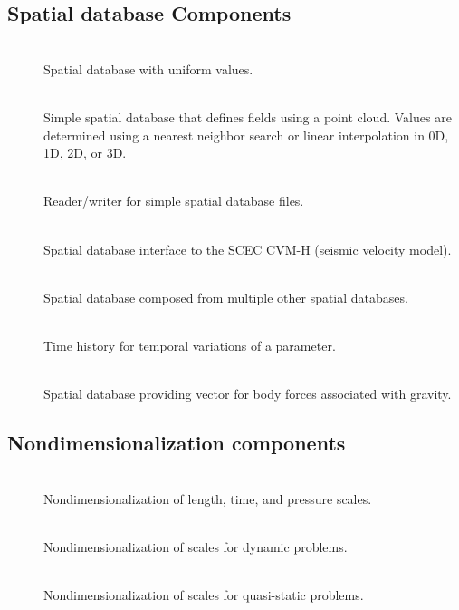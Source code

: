 \subsection{Spatial database Components}
\begin{description}
\item [] \\
Spatial database with uniform values.
\item [] \\
Simple spatial database that defines fields using a point cloud. Values
are determined using a nearest neighbor search or linear interpolation
in 0D, 1D, 2D, or 3D.
\item [] \\
Reader/writer for simple spatial database files.
\item [] \\
Spatial database interface to the SCEC CVM-H (seismic velocity model).
\item [] \\
Spatial database composed from multiple other spatial databases.
\item [] \\
Time history for temporal variations of a parameter.
\item [] \\
Spatial database providing vector for body forces associated with
gravity.
\end{description}

\subsection{Nondimensionalization components}
\begin{description}
\item [] \\
Nondimensionalization of length, time, and pressure scales.
\item [] \\
Nondimensionalization of scales for dynamic problems.
\item [] \\
Nondimensionalization of scales for quasi-static problems.
\end{description}

